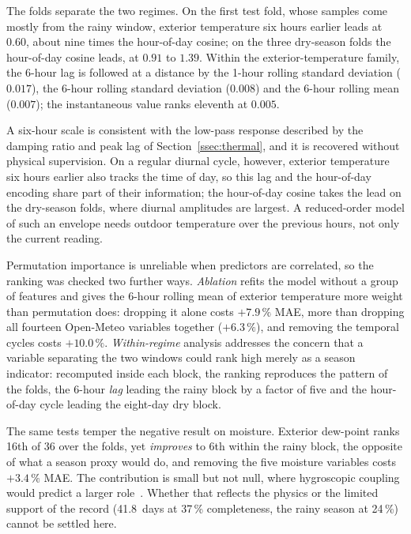 \documentclass[conference]{IEEEtran}
\begin{document}
The folds separate the two regimes. On the first test fold, whose
samples come mostly from the rainy window, exterior temperature six
hours earlier leads at $0.60$, about nine times the hour-of-day cosine;
on the three dry-season folds the hour-of-day cosine leads, at $0.91$
to $1.39$. Within the exterior-temperature family, the 6-hour lag is
followed at a distance by the 1-hour rolling standard deviation
($0.017$), the 6-hour rolling standard deviation ($0.008$) and the
6-hour rolling mean ($0.007$); the instantaneous value ranks eleventh
at $0.005$.

A six-hour scale is consistent with the low-pass response described by
the damping ratio and peak lag of Section~\ref{ssec:thermal}, and it is
recovered without physical supervision. On a regular diurnal cycle,
however, exterior temperature six hours earlier also tracks the time of
day, so this lag and the hour-of-day encoding share part of their
information; the hour-of-day cosine takes the lead on the dry-season
folds, where diurnal amplitudes are largest. A reduced-order model of
such an envelope needs outdoor temperature over the previous hours, not
only the current reading.

Permutation importance is unreliable when predictors are correlated, so
the ranking was checked two further ways. \textit{Ablation} refits the
model without a group of features and gives the 6-hour rolling mean of
exterior temperature more weight than permutation does: dropping it
alone costs $+7.9\,\%$ MAE, more than dropping all fourteen Open-Meteo
variables together ($+6.3\,\%$), and removing the temporal cycles costs
$+10.0\,\%$. \textit{Within-regime} analysis addresses the concern that
a variable separating the two windows could rank high merely as a season
indicator: recomputed inside each block, the ranking reproduces the
pattern of the folds, the 6-hour \emph{lag} leading the rainy block by a
factor of five and the hour-of-day cycle leading the eight-day dry
block.

The same tests temper the negative result on moisture. Exterior
dew-point ranks 16th of 36 over the folds, yet \emph{improves} to 6th within
the rainy block, the opposite of what a season proxy would do, and
removing the five moisture variables costs $+3.4\,\%$ MAE. The
contribution is small but not null, where hygroscopic coupling would
predict a larger role~\cite{liuzzi2018}. Whether that reflects the
physics or the limited support of the record (41.8~days at 37\,\%
completeness, the rainy season at 24\,\%) cannot be settled here.
\end{document}
